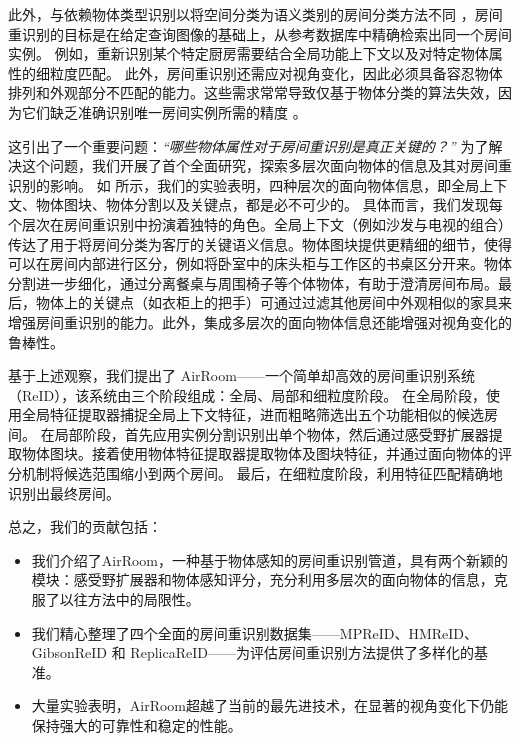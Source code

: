 此外，与依赖物体类型识别以将空间分类为语义类别的房间分类方法不同 \cite{lee2017roomnetendtoendroomlayout}，房间重识别的目标是在给定查询图像的基础上，从参考数据库中精确检索出同一个房间实例。  
例如，重新识别某个特定厨房需要结合全局功能上下文以及对特定物体属性的细粒度匹配。  
此外，房间重识别还需应对视角变化，因此必须具备容忍物体排列和外观部分不匹配的能力。这些需求常常导致仅基于物体分类的算法失效，因为它们缺乏准确识别唯一房间实例所需的精度 \cite{Snderhauf2015PlaceRW}。

这引出了一个重要问题：\textit{“哪些物体属性对于房间重识别是真正关键的？”}  
为了解决这个问题，我们开展了首个全面研究，探索多层次面向物体的信息及其对房间重识别的影响。  
如  所示，我们的实验表明，四种层次的面向物体信息，即全局上下文、物体图块、物体分割以及关键点，都是必不可少的。  
具体而言，我们发现每个层次在房间重识别中扮演着独特的角色。全局上下文（例如沙发与电视的组合）传达了用于将房间分类为客厅的关键语义信息。物体图块提供更精细的细节，使得可以在房间内部进行区分，例如将卧室中的床头柜与工作区的书桌区分开来。物体分割进一步细化，通过分离餐桌与周围椅子等个体物体，有助于澄清房间布局。最后，物体上的关键点（如衣柜上的把手）可通过过滤其他房间中外观相似的家具来增强房间重识别的能力。此外，集成多层次的面向物体信息还能增强对视角变化的鲁棒性。

基于上述观察，我们提出了 AirRoom——一个简单却高效的房间重识别系统（ReID），该系统由三个阶段组成：全局、局部和细粒度阶段。  
在全局阶段，使用全局特征提取器捕捉全局上下文特征，进而粗略筛选出五个功能相似的候选房间。  
在局部阶段，首先应用实例分割识别出单个物体，然后通过感受野扩展器提取物体图块。接着使用物体特征提取器提取物体及图块特征，并通过面向物体的评分机制将候选范围缩小到两个房间。  
最后，在细粒度阶段，利用特征匹配精确地识别出最终房间。

总之，我们的贡献包括：

\begin{itemize}[leftmargin=2em]
    \item 我们介绍了AirRoom，一种基于物体感知的房间重识别管道，具有两个新颖的模块：感受野扩展器和物体感知评分，充分利用多层次的面向物体的信息，克服了以往方法中的局限性。
    \item 我们精心整理了四个全面的房间重识别数据集——MPReID、HMReID、GibsonReID 和 ReplicaReID——为评估房间重识别方法提供了多样化的基准。
    \item 大量实验表明，AirRoom超越了当前的最先进技术，在显著的视角变化下仍能保持强大的可靠性和稳定的性能。
\end{itemize}
